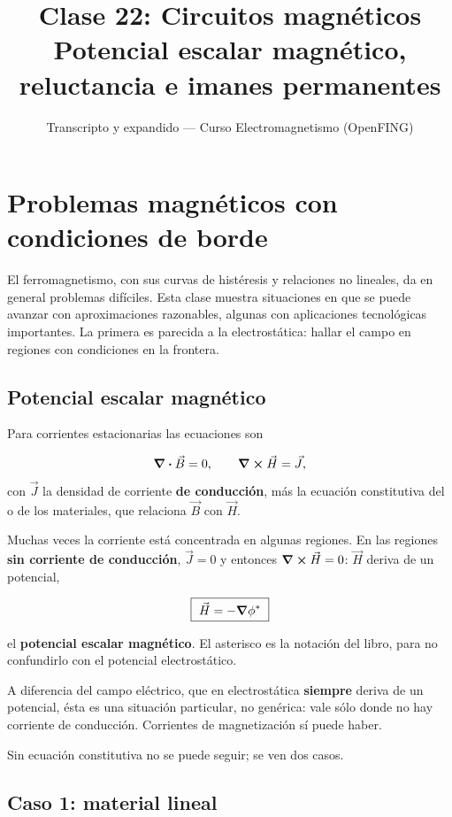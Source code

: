 \documentclass[12pt,a4paper]{article}
\title{\textbf{Clase 22: Circuitos magnéticos} \\[0.3em]
        \large{Potencial escalar magnético, reluctancia e imanes permanentes}}
\author{Transcripto y expandido --- Curso Electromagnetismo (OpenFING)}
\date{}
\begin{document}
\maketitle
\thispagestyle{empty}
\newpage

\tableofcontents
\newpage

\section{Problemas magnéticos con condiciones de borde}

El ferromagnetismo, con sus curvas de histéresis y relaciones no lineales, da
en general problemas difíciles. Esta clase muestra situaciones en que se puede
avanzar con aproximaciones razonables, algunas con aplicaciones tecnológicas
importantes. La primera es parecida a la electrostática: hallar el campo en
regiones con condiciones en la frontera.

\subsection{Potencial escalar magnético}

Para corrientes estacionarias las ecuaciones son

\[
\div\vec B = 0, \qquad \curl\vec H = \vec J,
\]
con $\vec J$ la densidad de corriente \textbf{de conducción}, más la ecuación
constitutiva del o de los materiales, que relaciona $\vec B$ con $\vec H$.

Muchas veces la corriente está concentrada en algunas regiones. En las regiones
\textbf{sin corriente de conducción}, $\vec J = 0$ y entonces $\curl\vec H = 0$:
$\vec H$ deriva de un potencial,

\begin{keybox}
\[
\boxed{\ \vec H = -\grad\phi^*\ }
\]
\end{keybox}
el \textbf{potencial escalar magnético}. El asterisco es la notación del libro, para
no confundirlo con el potencial electrostático.

\begin{notebox}
A diferencia del campo eléctrico, que en electrostática \textbf{siempre} deriva de
un potencial, ésta es una situación particular, no genérica: vale sólo donde
no hay corriente de conducción. Corrientes de magnetización sí puede haber.
\end{notebox}

Sin ecuación constitutiva no se puede seguir; se ven dos casos.

\subsection{Caso 1: material lineal}
\end{document}
